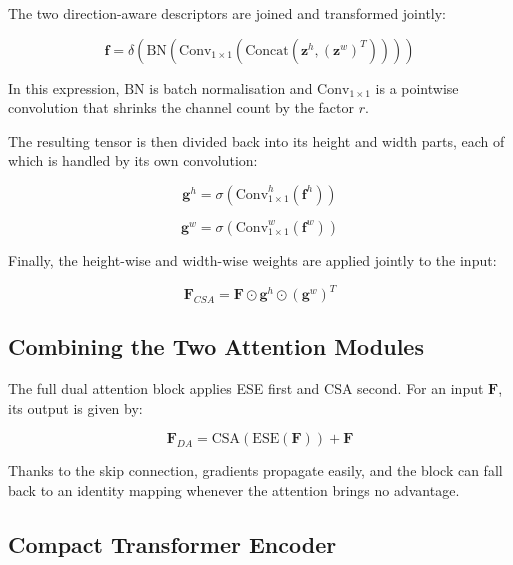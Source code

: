 \documentclass[default, iicol]{sn-jnl}
\theoremstyle{thmstyleone}%
\theoremstyle{thmstyletwo}%
\theoremstyle{thmstylethree}%
\begin{document}
The two direction-aware descriptors are joined and transformed jointly:

\begin{equation}
\mathbf{f} = \delta\left(\text{BN}\left(\text{Conv}_{1\times1}\left(\text{Concat}(\mathbf{z}^h, (\mathbf{z}^w)^T)\right)\right)\right)
\label{eq:coord_concat}
\end{equation}

In this expression, $\text{BN}$ is batch normalisation and $\text{Conv}_{1\times1}$ is a pointwise convolution that shrinks the channel count by the factor $r$.

The resulting tensor is then divided back into its height and width parts, each of which is handled by its own convolution:

\begin{equation}
\mathbf{g}^h = \sigma\left(\text{Conv}_{1\times1}^h(\mathbf{f}^h)\right)
\label{eq:gh}
\end{equation}

\begin{equation}
\mathbf{g}^w = \sigma\left(\text{Conv}_{1\times1}^w(\mathbf{f}^w)\right)
\label{eq:gw}
\end{equation}

Finally, the height-wise and width-wise weights are applied jointly to the input:

\begin{equation}
\mathbf{F}_{CSA} = \mathbf{F} \odot \mathbf{g}^h \odot (\mathbf{g}^w)^T
\label{eq:csa_output}
\end{equation}

\subsection{Combining the Two Attention Modules}

The full dual attention block applies ESE first and CSA second. For an input $\mathbf{F}$, its output is given by:

\begin{equation}
\mathbf{F}_{DA} = \text{CSA}\left(\text{ESE}(\mathbf{F})\right) + \mathbf{F}
\label{eq:dual_attention}
\end{equation}

Thanks to the skip connection, gradients propagate easily, and the block can fall back to an identity mapping whenever the attention brings no advantage.

\subsection{Compact Transformer Encoder}
\end{document}

